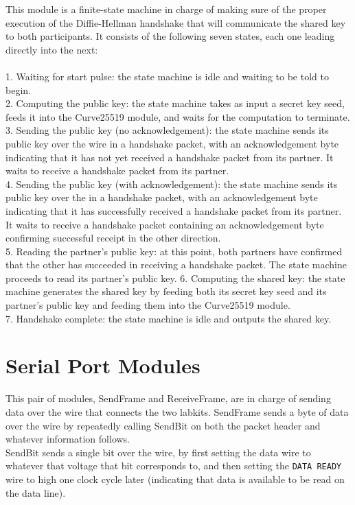 \documentclass[a4paper]{report}
\begin{document}
This module is a finite-state machine in charge of making sure of the proper execution of the Diffie-Hellman handshake that will communicate the shared key to both participants. It consists of the following seven states, each one leading directly into the next: \\ \\
1. Waiting for start pulse: the state machine is idle and waiting to be told to begin. \\
2. Computing the public key: the state machine takes as input a secret key seed, feeds it into the Curve25519 module, and waits for the computation to terminate. \\
3. Sending the public key (no acknowledgement): the state machine sends its public key over the wire in a handshake packet, with an acknowledgement byte indicating that it has not yet received a handshake packet from its partner. It waits to receive a handshake packet from its partner. \\
4. Sending the public key (with acknowledgement): the state machine sends its public key over the in a handshake packet, with an acknowledgement byte indicating that it has successfully received a handshake packet from its partner. It waits to receive a handshake packet containing an acknowledgement byte confirming successful receipt in the other direction. \\
5. Reading the partner's public key: at this point, both partners have confirmed that the other has succeeded in receiving a handshake packet. The state machine proceeds to read its partner's public key. 
6. Computing the shared key: the state machine generates the shared key by feeding both its secret key seed and its partner's public key and feeding them into the Curve25519 module. \\
7. Handshake complete: the state machine is idle and outputs the shared key. \\

\section{Serial Port Modules}

This pair of modules, SendFrame and ReceiveFrame, are in charge of sending data over the wire that connects the two labkits. SendFrame sends a byte of data over the wire by repeatedly calling SendBit on both the packet header and whatever information follows. \\

SendBit sends a single bit over the wire, by first setting the data wire to whatever that voltage that bit corresponds to, and then setting the \verb|DATA READY| wire to high one clock cycle later (indicating that data is available to be read on the data line). \\
\end{document}
